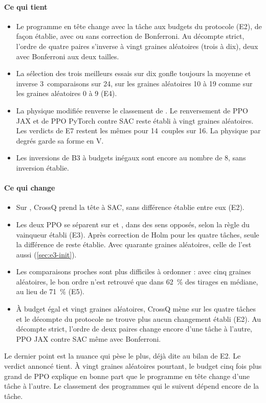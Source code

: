 \paragraph{Ce qui tient}
\begin{itemize}
  \item Le programme en tête change avec la tâche aux budgets du protocole (E2), de façon établie, avec ou sans
    correction de Bonferroni. Au décompte strict, l'ordre de quatre paires s'inverse à vingt graines
    aléatoires (trois à dix), deux avec Bonferroni aux deux tailles.
  \item La sélection des trois meilleurs essais sur dix gonfle toujours la moyenne et inverse 3~comparaisons
    sur 24, sur les graines aléatoires 10 à 19 comme sur les graines aléatoires 0 à 9 (E4).
  \item La physique modifiée renverse le classement de . Le renversement de PPO JAX et de PPO
    PyTorch contre SAC reste établi à vingt graines aléatoires. Les verdicts de E7 restent les mêmes
    pour 14~couples sur 16. La physique par degrés garde sa forme en V.
  \item Les inversions de B3 à budgets inégaux sont encore au nombre de 8, sans inversion établie.
\end{itemize}

\paragraph{Ce qui change}
\begin{itemize}
  \item Sur , CrossQ prend la tête à SAC, sans différence établie entre eux (E2).
  \item Les deux PPO se séparent sur  et , dans des sens opposés,
    selon la règle du vainqueur établi (E3). Après correction de Holm pour les quatre tâches, seule la différence
    de  reste établie. Avec quarante graines aléatoires, celle de  l'est aussi
    (\cref{sec:e3-init}).
  \item Les comparaisons proches sont plus difficiles à ordonner : avec cinq graines aléatoires, le bon ordre n'est
    retrouvé que dans 62~\% des tirages en médiane, au lieu de 71~\% (E5).
  \item À budget égal et vingt graines aléatoires, CrossQ mène sur les quatre tâches et le décompte
    du protocole ne trouve plus aucun changement établi (E2). Au décompte strict, l'ordre de deux paires
    change encore d'une tâche à l'autre, PPO JAX contre SAC même avec Bonferroni.
\end{itemize}
Le dernier point est la nuance qui pèse le plus, déjà dite au bilan de E2. Le verdict annoncé tient. À vingt
graines aléatoires pourtant, le budget cinq fois plus grand de PPO explique en bonne part que le programme en
tête change d'une tâche à l'autre. Le classement des programmes qui le suivent dépend encore de la tâche.

